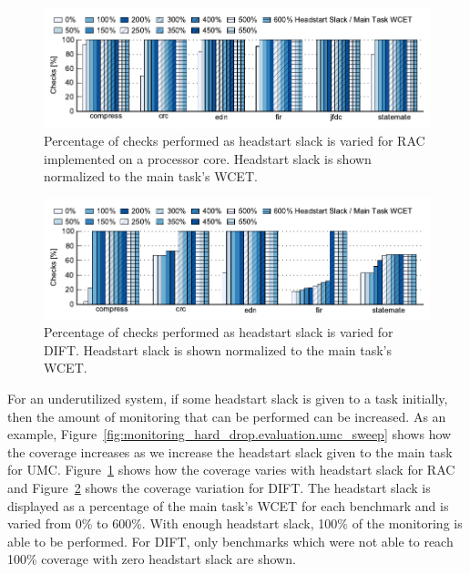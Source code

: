 \begin{figure}
  \begin{center}
    \includegraphics{monitoring_hard_drop/data/lrc_sweep.pdf}
    \caption{Percentage of checks performed as headstart slack is varied for
    RAC implemented on a processor core. Headstart slack is shown normalized
    to the main task's WCET.}
    \label{fig:monitoring_hard_drop.evaluation.lrc_sweep}
  \end{center}
\end{figure}

\begin{figure}
  \begin{center}
    \includegraphics{monitoring_hard_drop/data/dift_sweep.pdf}
    \caption{Percentage of checks performed as headstart slack is varied for
    DIFT. Headstart slack is shown normalized to the main task's WCET.}
    \label{fig:monitoring_hard_drop.evaluation.dift_sweep}
  \end{center}
\end{figure}

For an underutilized system, if some headstart slack is given to a task
initially, then the amount of monitoring that can be performed can be
increased. As an example,
Figure~\ref{fig:monitoring_hard_drop.evaluation.umc_sweep} shows how the
coverage increases as we increase the headstart slack given to the main task
for UMC. Figure~\ref{fig:monitoring_hard_drop.evaluation.lrc_sweep} shows how
the coverage varies with headstart slack for RAC and
Figure~\ref{fig:monitoring_hard_drop.evaluation.dift_sweep} shows the coverage
variation for DIFT. The
headstart slack is displayed as a percentage of the main task's WCET for each
benchmark and is varied from 0\% to 600\%. With enough headstart slack, 100\%
of the monitoring is able to be performed. For DIFT, only benchmarks which were
not able to reach 100\% coverage with zero headstart slack are shown.  

